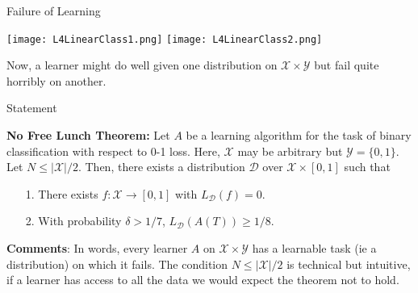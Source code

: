 \documentclass[10pt, table, dvipsnames,handout]{beamer}
\newcommand{\cD}{\ensuremath{\mathcal{D}}}
\newcommand{\cX}{\ensuremath{\mathcal{X}}}
\newcommand{\cY}{\ensuremath{\mathcal{Y}}}
\begin{document}
\begin{frame}[fragile]{Failure of Learning}
  \begin{minipage}[t][0.5\textheight][t]{\textwidth}
    \begin{overprint}
	   \centering \texttt{[image: L4LinearClass1.png]}
	  \onslide<2,3,4|handout:1> \centering \texttt{[image: L4LinearClass2.png]}
    \end{overprint}
  \end{minipage}
  \vfill
  \begin{minipage}[t][0.5\textheight][t]{\textwidth}
Now, a learner might do well given one distribution on $\cX\times \cY$ but fail quite horribly on another. \newline

\end{minipage}
\end{frame}








\begin{frame}[fragile]{Statement}

\textbf{No Free Lunch Theorem:} Let $A$ be a learning algorithm for the task of binary classification with respect to 0-1 loss. Here, $\cX$ may be arbitrary but $\cY=\{0,1\}$. Let $N\leq |\cX|/2$. Then, there exists a distribution $\mathcal{D}$ over $\cX \times [0,1]$ such that
\begin{enumerate}
\item[1.] There exists $f:\cX\to[0,1]$ with $L_\cD(f) = 0$.
\item[2.] With probability $\delta>1/7$, $L_\cD(A(T))\geq 1/8$. 
\end{enumerate}

\textbf{Comments}: In words, every learner $A$ on $\mathcal{X}\times\mathcal{Y}$ has a learnable task (ie a distribution) on which it fails. \pause The condition $N\leq |\cX|/2$ is technical but intuitive, if a learner has access to all the data we would expect the theorem not to hold. 

\end{frame}
\end{document}
